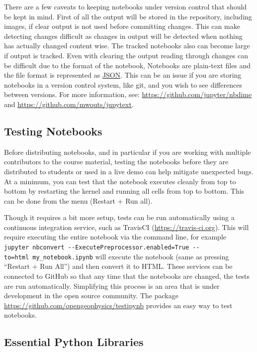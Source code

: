 \documentclass[]{book}
\begin{document}
There are a few caveats to keeping notebooks under version control that
should be kept in mind. First of all the output will be stored in the
repository, including images, if clear output is not used before
committing changes. This can make detecting changes difficult as changes
in output will be detected when nothing has actually changed content
wise. The tracked notebooks also can become large if output is tracked.
Even with clearing the output reading through changes can be difficult
due to the format of the notebook, Notebooks are plain-text files and
the file format is represented as \href{https://www.json.org/}{JSON}.
This can be an issue if you are storing notebooks in a version control
system, like git, and you wish to see differences between versions. For
more information, see: \url{https://github.com/jupyter/nbdime} and
\url{https://github.com/mwouts/jupytext}.

\subsection{Testing Notebooks}\label{testing-notebooks}

Before distributing notebooks, and in particular if you are working with
multiple contributors to the course material, testing the notebooks
before they are distributed to students or used in a live demo can help
mitigate unexpected bugs. At a minimum, you can test that the notebook
executes cleanly from top to bottom by restarting the kernel and running
all cells from top to bottom. This can be done from the menu (Restart +
Run all).

Though it requires a bit more setup, tests can be run automatically
using a continuous integration service, such as TravisCI
(\url{https://travis-ci.org}). This will require executing the entire
notebook via the command line, for example
\texttt{jupyter\ nbconvert\ -\/-ExecutePreprocessor.enabled=True\ -\/-to=html\ my\_notebook.ipynb}
will execute the notebook (same as pressing ``Restart + Run All'') and
then convert it to HTML. These services can be connected to GitHub so
that any time that the notebooks are changed, the tests are run
automatically. Simplifying this process is an area that is under
development in the open source community. The package
\url{https://github.com/opengeophysics/testipynb} provides an easy way
to test notebooks.

\subsection{Essential Python
Libraries}\label{essential-python-libraries}
\end{document}
